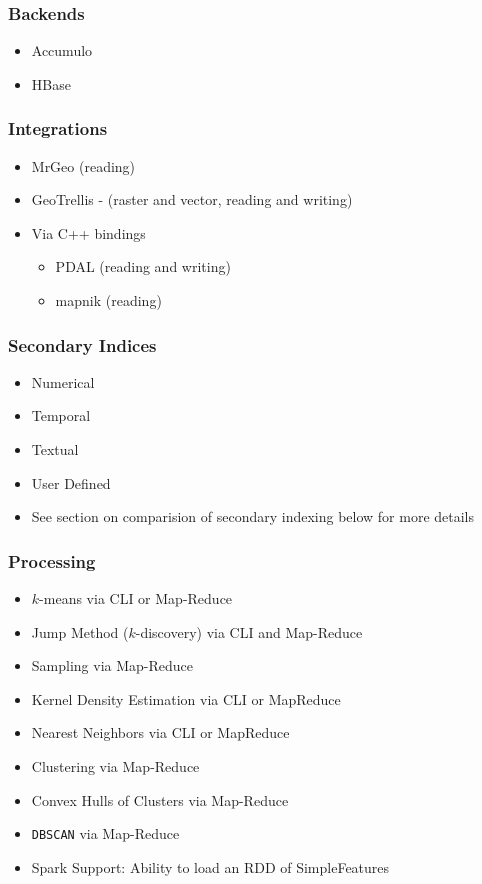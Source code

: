 \subsubsection*{Backends}

\begin{itemize}
\item Accumulo
\item HBase
\end{itemize}

\subsubsection*{Integrations}

\begin{itemize}
\item MrGeo (reading)
\item GeoTrellis - (raster and vector, reading and writing)
\item{
  Via C++ bindings
  \begin{itemize}
  \item PDAL (reading and writing)
  \item mapnik (reading)
  \end{itemize}
}
\end{itemize}


\subsubsection*{Secondary Indices}

\begin{itemize}
\item Numerical
\item Temporal
\item Textual
\item User Defined
\item See section on comparision of secondary indexing below for more details
\end{itemize}

\subsubsection*{Processing}

\begin{itemize}
\item $k$-means via CLI or Map-Reduce
\item Jump Method ($k$-discovery) via CLI and Map-Reduce
\item Sampling via Map-Reduce
\item Kernel Density Estimation via CLI or MapReduce
\item Nearest Neighbors via CLI or MapReduce
\item Clustering via Map-Reduce
\item Convex Hulls of Clusters via Map-Reduce
\item \texttt{DBSCAN} via Map-Reduce
\item Spark Support: Ability to load an RDD of SimpleFeatures
\end{itemize}

